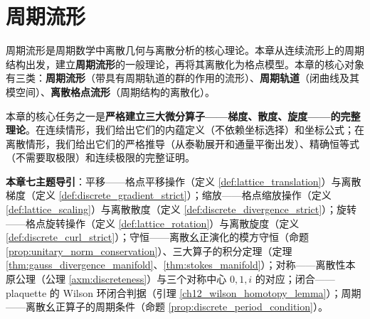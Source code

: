\chapter{周期流形}

\begin{remark}[本章定位]\label{rem:periodic_manifold_chapter_positioning}
周期流形是周期数学中离散几何与离散分析的核心理论。本章从连续流形上的周期结构出发，建立\textbf{周期流形}的一般理论，再将其离散化为格点模型。本章的核心对象有三类：\textbf{周期流形}（带具有周期轨道的群的作用的流形）、\textbf{周期轨道}（闭曲线及其模空间）、\textbf{离散格点流形}（周期结构的离散化）。

本章的核心任务之一是\textbf{严格建立三大微分算子——梯度、散度、旋度——的完整理论}。在连续情形，我们给出它们的内蕴定义（不依赖坐标选择）和坐标公式；在离散情形，我们给出它们的严格推导（从泰勒展开和通量平衡出发）、精确恒等式（不需要取极限）和连续极限的完整证明。

\textbf{本章七主题导引}：平移——格点平移操作（定义 \ref{def:lattice_translation}）与离散梯度（定义 \ref{def:discrete_gradient_strict}）；缩放——格点缩放操作（定义 \ref{def:lattice_scaling}）与离散散度（定义 \ref{def:discrete_divergence_strict}）；旋转——格点旋转操作（定义 \ref{def:lattice_rotation}）与离散旋度（定义 \ref{def:discrete_curl_strict}）；守恒——离散幺正演化的模方守恒（命题 \ref{prop:unitary_norm_conservation}）、三大算子的积分定理（定理 \ref{thm:gauss_divergence_manifold}、\ref{thm:stokes_manifold}）；对称——离散性本原公理（公理 \ref{axm:discreteness}）与三个对称中心 $0,1,i$ 的对应；闭合——plaquette 的 Wilson 环闭合判据（引理 \ref{ch12_wilson_homotopy_lemma}）；周期——离散幺正算子的周期条件（命题 \ref{prop:discrete_period_condition}）。
\end{remark}

